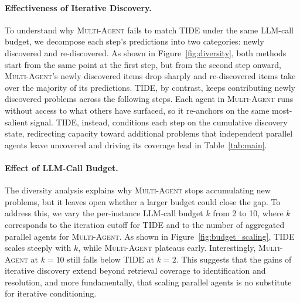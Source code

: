 \paragraph{Effectiveness of Iterative Discovery.}
To understand why \textsc{Multi-Agent} fails to match \textsc{TIDE} under the same LLM-call budget, we decompose each step's predictions into two categories: newly discovered and re-discovered.
As shown in Figure~\ref{fig:diversity}, both methods start from the same point at the first step, but from the second step onward, \textsc{Multi-Agent}'s newly discovered items drop sharply and re-discovered items take over the majority of its predictions.
\textsc{TIDE}, by contrast, keeps contributing newly discovered problems across the following steps.
Each agent in \textsc{Multi-Agent} runs without access to what others have surfaced, so it re-anchors on the same most-salient signal.
\textsc{TIDE}, instead, conditions each step on the cumulative discovery state, redirecting capacity toward additional problems that independent parallel agents leave uncovered and driving its coverage lead in Table~\ref{tab:main}.




\paragraph{Effect of LLM-Call Budget.}
The diversity analysis explains why \textsc{Multi-Agent} stops accumulating new problems, but it leaves open whether a larger budget could close the gap.
To address this, we vary the per-instance LLM-call budget $k$ from 2 to 10, where $k$ corresponds to the iteration cutoff for \textsc{TIDE} and to the number of aggregated parallel agents for \textsc{Multi-Agent}.
As shown in Figure~\ref{fig:budget_scaling}, \textsc{TIDE} scales steeply with $k$, while \textsc{Multi-Agent} plateaus early. Interestingly, \textsc{Multi-Agent} at $k{=}10$ still falls below \textsc{TIDE} at $k{=}2$.
This suggests that the gains of iterative discovery extend beyond retrieval coverage to identification and resolution, and more fundamentally, that scaling parallel agents is no substitute for iterative conditioning.



